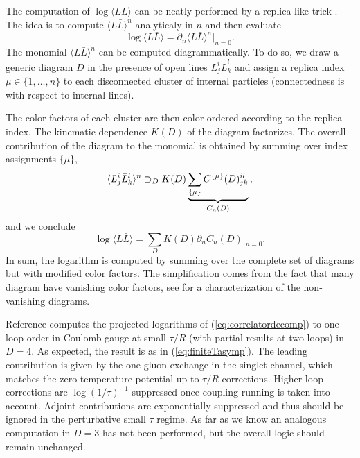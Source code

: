 \documentclass[
 reprint,
 amsmath,
 pre,
 amssymb,
 nofootinbib,
 aps,
 longbibliography,
]{revtex4-1}
\newcommand{\<}{{\langle}}
\renewcommand{\>}{{\rangle}}
\begin{document}
The computation of $\log\langle L \bar{L}\rangle$ can be neatly performed by a replica-like trick \cite{Berwein:2017thy}. The idea is to compute $ \langle L\bar{L}\rangle^n$ analyticaly in $n$ and then evaluate
\begin{equation}
    \log \langle L \bar{L}\rangle  = \partial_n \langle L \bar{L}\rangle^n\vert_{n=0}.
\end{equation}
The monomial $ \langle L \bar{L}\rangle^n$ can be computed diagrammatically. To do so, we draw a generic diagram $D$ in the presence of open lines $ L^{i}_j \bar{L}^l_k$ and assign a replica index $ \mu \in \{1,\dots,n\}$ to each disconnected cluster of internal particles (connectedness is with respect to internal lines).

The color factors of each cluster are then color ordered according to the replica index. The kinematic dependence $K(D)$ of the diagram factorizes. The overall contribution of the diagram to the monomial is obtained by summing over index assignments $\{\mu\}$,
\begin{equation}
     \langle L^{i}_j \bar{L}^l_k\rangle^n \supset_D K(D)\underbrace{\sum_{\{ \mu\}} C^{\{ \mu\}}(D)^{i l}_{jk}}_{C_n(D)}\,,
     \vspace{-15pt}
\end{equation}
 and we conclude
 \begin{equation}
     \log \langle L \bar{L}\rangle  =\sum_D K(D) \partial_n C_n(D)\vert_{n=0} .
 \end{equation}
 In sum, the logarithm is computed by summing over the complete set of diagrams but with modified color factors. The simplification comes from the fact that many diagram have vanishing color factors, see \cite{Gardi:2013ita} for a characterization of the non-vanishing diagrams.

Reference \cite{Berwein:2017thy} computes the projected logarithms of (\ref{eq:correlatordecomp}) to one-loop order in Coulomb gauge at small $\tau /R$ (with partial results at two-loops) in $D=4$. As expected, the result is as in (\ref{eq:finiteTasymp}). The leading contribution is given by the one-gluon exchange in the singlet channel, which matches the zero-temperature potential up to $\tau/R$ corrections. Higher-loop corrections are $\log(1/\tau)^{-1}$ suppressed once coupling running is taken into account. Adjoint contributions are exponentially suppressed and thus should be ignored in the perturbative small $\tau$ regime. As far as we know an analogous computation in $D=3$ has not been performed, but the overall logic should remain unchanged.
\end{document}
